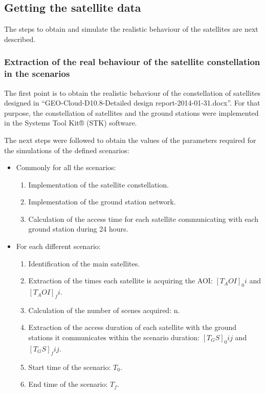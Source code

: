 \subsection{Getting the satellite data}
\label{subsec:getting-satellite-data}

The steps to obtain and simulate the realistic behaviour of the satellites are
next described. 


\subsubsection{Extraction of the real behaviour of the satellite constellation
  in the scenarios}
\label{subsubsec:extraction}

The first point is to obtain the realistic behaviour of the constellation of satellites designed in “GEO-Cloud-D10.8-Detailed design report-2014-01-31.docx”.  For that purpose, the constellation of satellites and the ground stations were implemented in the Systems Tool Kit® (STK) software.

The next steps were followed to obtain the values of the parameters required for the simulations of the defined scenarios:
\begin{itemize}
\item Commonly for all the scenarios:
\begin{enumerate}
\item Implementation of the satellite constellation.
\item Implementation of the ground station network.
\item Calculation of the access time for each satellite communicating with each
  ground station during 24 hours.
\setcounter{enumTemp}{\theenumi}
\end{enumerate}
\item For each different scenario:
\begin{enumerate}
\setcounter{enumi}{\theenumTemp}
\item Identification of the main satellites.
\item Extraction of the times each satellite is acquiring the AOI: $[T_AOI]_0i$ and $[T_AOI]_fi$.
\item Calculation of the number of scenes acquired: n.
\item Extraction of the access duration of each satellite with the ground stations it communicates within the scenario duration: $[T_GS]_0ij$ and $[T_GS]_fij$.
\item Start time of the scenario: $T_0$.
\item End time of the scenario: $T_f$.
\end{enumerate}
\end{itemize}

